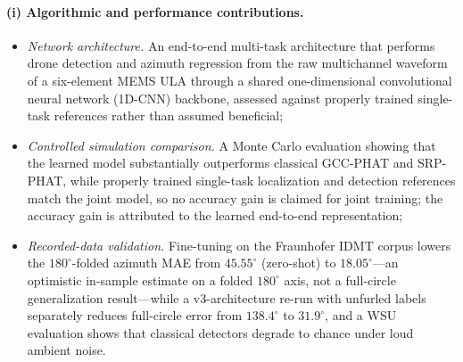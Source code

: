 \documentclass[sensors,article,submit,pdftex,moreauthors]{Definitions/mdpi}
\begin{document}
\paragraph{(i) Algorithmic and performance contributions.}
\begin{itemize}
    \item \emph{Network architecture.} An end-to-end multi-task architecture that performs drone detection and azimuth regression from the raw multichannel waveform of a six-element MEMS ULA through a shared one-dimensional convolutional neural network (1D-CNN) backbone, assessed against properly trained single-task references rather than assumed beneficial;
    \item \emph{Controlled simulation comparison.} A Monte Carlo evaluation showing that the learned model substantially outperforms classical GCC-PHAT and SRP-PHAT, while properly trained single-task localization and detection references match the joint model, so no accuracy gain is claimed for joint training; the accuracy gain is attributed to the learned end-to-end representation;
    \item \emph{Recorded-data validation.} Fine-tuning on the Fraunhofer IDMT corpus lowers the $180^\circ$-folded azimuth MAE from $45.55^\circ$ (zero-shot) to $18.05^\circ$---an optimistic in-sample estimate on a folded $180^\circ$ axis, not a full-circle generalization result---while a v3-architecture re-run with unfurled labels separately reduces full-circle error from $138.4^\circ$ to $31.9^\circ$, and a WSU evaluation shows that classical detectors degrade to chance under loud ambient noise.
\end{itemize}
\end{document}
